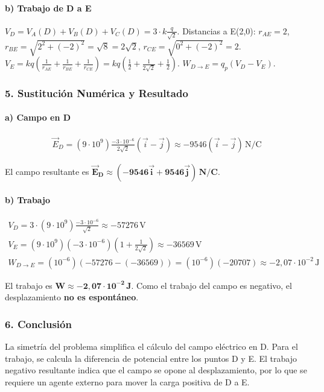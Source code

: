 \paragraph{b) Trabajo de D a E}
$V_D = V_A(D)+V_B(D)+V_C(D) = 3 \cdot k\frac{q}{\sqrt{2}}$.
Distancias a E(2,0): $r_{AE}=2$, $r_{BE}=\sqrt{2^2+(-2)^2}=\sqrt{8}=2\sqrt{2}$, $r_{CE}=\sqrt{0^2+(-2)^2}=2$.
$V_E = k q (\frac{1}{r_{AE}}+\frac{1}{r_{BE}}+\frac{1}{r_{CE}}) = kq(\frac{1}{2}+\frac{1}{2\sqrt{2}}+\frac{1}{2})$.
$W_{D \to E} = q_p(V_D-V_E)$.
\subsubsection*{5. Sustitución Numérica y Resultado}
\paragraph{a) Campo en D}
\begin{gather}
    \vec{E}_D = (9\cdot10^9)\frac{-3\cdot10^{-6}}{2\sqrt{2}}(\vec{i}-\vec{j}) \approx -9546(\vec{i}-\vec{j})\,\text{N/C}
\end{gather}
\begin{cajaresultado}
El campo resultante es $\boldsymbol{\vec{E}_D \approx (-9546\vec{i} + 9546\vec{j})\,\textbf{N/C}}$.
\end{cajaresultado}
\paragraph{b) Trabajo}
\begin{gather}
    V_D = 3 \cdot (9\cdot10^9)\frac{-3\cdot10^{-6}}{\sqrt{2}} \approx -57276\,\text{V} \\
    V_E = (9\cdot10^9)(-3\cdot10^{-6})\left(1+\frac{1}{2\sqrt{2}}\right) \approx -36569\,\text{V} \\
    W_{D \to E} = (10^{-6})(-57276 - (-36569)) = (10^{-6})(-20707) \approx -2,07\cdot10^{-2}\,\text{J}
\end{gather}
\begin{cajaresultado}
El trabajo es $\boldsymbol{W \approx -2,07\cdot10^{-2}\,\textbf{J}}$. Como el trabajo del campo es negativo, el desplazamiento \textbf{no es espontáneo}.
\end{cajaresultado}
\subsubsection*{6. Conclusión}
\begin{cajaconclusion}
La simetría del problema simplifica el cálculo del campo eléctrico en D. Para el trabajo, se calcula la diferencia de potencial entre los puntos D y E. El trabajo negativo resultante indica que el campo se opone al desplazamiento, por lo que se requiere un agente externo para mover la carga positiva de D a E.
\end{cajaconclusion}
\newpage

